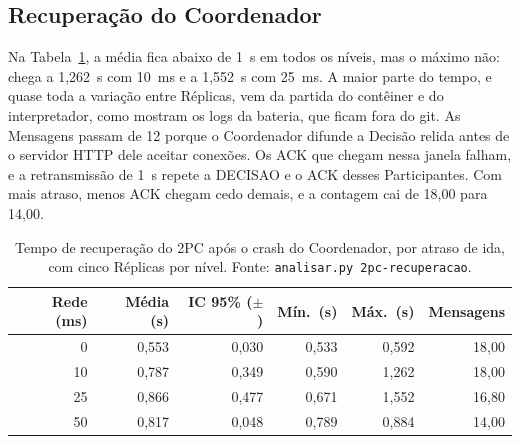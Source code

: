 \documentclass[conference]{IEEEtran}
\newcommand{\cod}[1]{\texttt{\upshape #1}}
\begin{document}
\subsection{Recuperação do Coordenador}
Na Tabela~\ref{tab:2pc-rec}, a média fica abaixo de 1~s em todos os níveis, mas o máximo não: chega
a 1,262~s com 10~ms e a 1,552~s com 25~ms. A maior parte do tempo, e quase toda a variação entre
Réplicas, vem da partida do contêiner e do interpretador, como mostram os logs da bateria, que
ficam fora do git. As Mensagens passam de 12
porque o Coordenador difunde a Decisão relida antes de o servidor HTTP dele aceitar conexões. Os
ACK que chegam nessa janela falham, e a retransmissão de 1~s repete a DECISAO e o ACK desses
Participantes. Com mais atraso, menos ACK chegam cedo demais, e a contagem cai de 18,00 para 14,00.

\begin{table}[t]
\caption{Tempo de recuperação do 2PC após o crash do Coordenador, por atraso de ida, com cinco
Réplicas por nível. Fonte: \cod{analisar.py 2pc-recuperacao}.}
\label{tab:2pc-rec}
\centering
\footnotesize
\setlength{\tabcolsep}{4pt}
\begin{tabular}{@{}rrrrrr@{}}
\toprule
Rede (ms) & Média (s) & IC 95\% ($\pm$) & Mín.\ (s) & Máx.\ (s) & Mensagens \\
\midrule
0  & 0,553 & 0,030 & 0,533 & 0,592 & 18,00 \\
10 & 0,787 & 0,349 & 0,590 & 1,262 & 18,00 \\
25 & 0,866 & 0,477 & 0,671 & 1,552 & 16,80 \\
50 & 0,817 & 0,048 & 0,789 & 0,884 & 14,00 \\
\bottomrule
\end{tabular}
\end{table}
\end{document}
